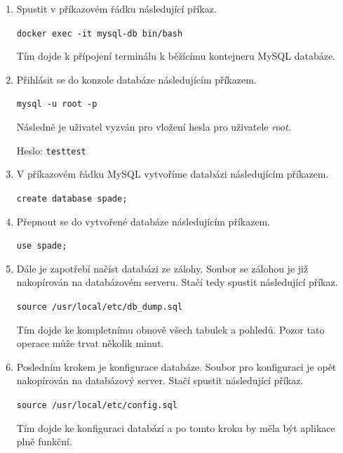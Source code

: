 \documentclass[czech,DP]{thesiskiv}
\begin{document}
\begin{enumerate}
    \item Spustit v příkazovém řádku následující příkaz.
    \begin{center}
    \verb|docker exec -it mysql-db bin/bash|    
    \end{center}
    Tím dojde k přípojení terminálu k běžícímu kontejneru MySQL databáze.
    \item Přihlásit se do konzole databáze následujícím příkazem.
    \begin{center}
    \verb|mysql -u root -p|    
    \end{center}
    Následně je uživatel vyzván pro vložení hesla pro uživatele \textit{root}.
    \begin{center}
    Heslo: \verb|testtest|    
    \end{center}
    \item V příkazovém řádku MySQL vytvoříme databázi následujícím příkazem.
    \begin{center}
    \verb|create database spade;|    
    \end{center}
    \item Přepnout se do vytvořené databáze následujícím příkazem.
    \begin{center}
    \verb|use spade;|    
    \end{center}
    \item Dále je zapotřebí načíst databázi ze zálohy. Soubor se zálohou je již nakopírován na databázovém serveru. Stačí tedy spustit následující příkaz.
     \begin{center}
    \verb|source /usr/local/etc/db_dump.sql|
    \end{center}
    Tím dojde ke kompletnímu obnově všech tabulek a pohledů. Pozor tato operace může trvat několik minut.
    \item Posledním krokem je konfigurace databáze. Soubor pro konfiguraci je opět nakopírován na databázový server. Stačí spustit následující příkaz.
    \begin{center}
    \verb|source /usr/local/etc/config.sql|
    \end{center}
    Tím dojde ke konfiguraci databází a po tomto kroku by měla být aplikace plně funkční.
\end{enumerate}
\end{document}
